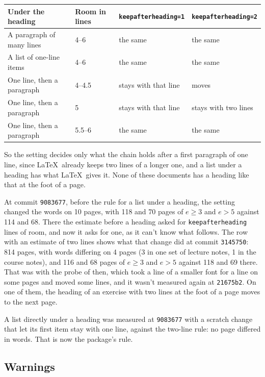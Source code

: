 \begin{center}\small
\begin{tabular}{@{}llll@{}}
\toprule
Under the heading & Room in lines & \texttt{keepafterheading=1} & \texttt{keepafterheading=2} \\
\midrule
A paragraph of many lines & 4--6 & the same & the same \\
A list of one-line items & 4--6 & the same & the same \\
One line, then a paragraph & 4--4.5 & stays with that line & moves \\
One line, then a paragraph & 5 & stays with that line & stays with two lines \\
One line, then a paragraph & 5.5--6 & the same & the same \\
\bottomrule
\end{tabular}
\end{center}

So the setting decides only what the chain holds after a first paragraph of one line, since \LaTeX\
already keeps two lines of a longer one, and a list under a heading has what \LaTeX\ gives it.
None of these documents has a heading like that at the foot of a page.

At commit \texttt{9083677}, before the rule for a list under a heading, the setting changed the words
on 10 pages, with 118 and 70 pages of $e\ge3$ and $e>5$ against 114 and 68.
There the estimate before a heading asked for \texttt{keepafterheading} lines of room, and now it
asks for one, as it can't know what follows.
The row with an estimate of two lines shows what that change did at commit \texttt{3145750}: 814 pages,
with words differing on 4 pages (3 in one set of lecture notes, 1 in the course notes), and 116 and 68 pages of $e\ge3$ and $e>5$ against 118 and 69 there.
That was with the probe of then, which took a line of a smaller font for a line on some pages and
moved some lines, and it wasn't measured again at \texttt{21675b2}.
On one of them, the heading of an exercise with two lines at the foot of a page moves to the next page.

A list directly under a heading was measured at \texttt{9083677} with a scratch change that let its
first item stay with one line, against the two-line rule: no page differed in words.
That is now the package's rule.

\subsection{Warnings}

